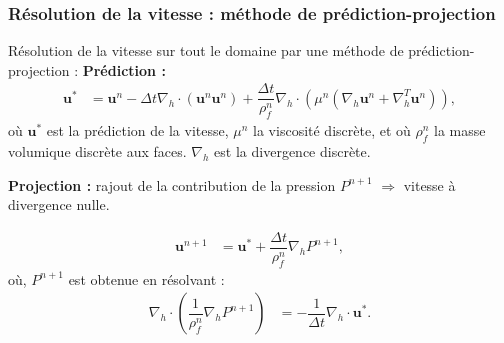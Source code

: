 \documentclass{beamer}
\newcommand{\vect}[1]{\bm{#1}}
\newcommand{\npl}{{n+1}}
\renewcommand{\frac}{\dfrac}
\begin{document}
\begin{frame}
    \frametitle{Résolution de la vitesse : méthode de prédiction-projection}
    \footnotesize
    \begin{ceablock}{Résolution de la vitesse sur tout le domaine par une méthode de prédiction-projection :}
	\textbf{Prédiction :}
	\begin{align} 
		\vect{u}^* &= \vect{u}^n - \Delta t \nabla_h \cdot (\vect{u}^n \vect{u}^n) + \frac{\Delta t}{\rho^n_f} \nabla_h \cdot(\mu^n(\nabla_h \vect{u}^n+\nabla^T_h \vect{u}^n)),
	\end{align}
	\color{cea_texte!70}où $\vect{u}^*$ est la prédiction de la vitesse, $\mu^n$ la viscosité discrète, et où $\rho^n_f$ la masse volumique discrète aux faces. $\nabla_h$ est la divergence discrète. \color{cea_texte}\\  %
	\vspace{0.3cm}

	\textbf{Projection :}
rajout de la contribution de la pression $P^\npl$ $\Rightarrow$ vitesse à divergence nulle.

	\begin{align}
		\vect{u}^{n+1} &= \vect{u}^* + \frac{\Delta t}{\rho^n_f} \nabla_h P^{n+1},
	\end{align}
	\color{cea_texte!70}où, $P^{n+1}$ est obtenue en résolvant : \color{cea_texte}
\begin{align}
\label{eq:Pression}
					 \nabla_h \cdot  \left( \frac{1}{\rho^n_f} \nabla_h P^\npl \right) &=  -\frac{1}{\Delta t} \nabla_h \cdot \vect{u}^*. 
\end{align}
	\end{ceablock}

\end{frame}
\end{document}
